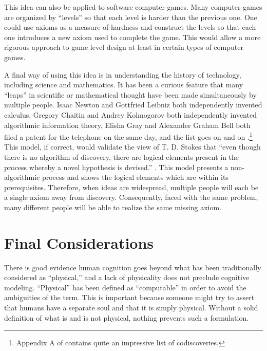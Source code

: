 This idea can also be applied to software computer games.  Many computer games are organized by ``levels'' so that each level is harder than the previous one.  One could use axioms as a measure of hardness and construct the levels so that each one introduces a new axiom used to complete the game.  This would allow a more rigorous approach to game level design at least in certain types of computer games.

A final way of using this idea is in understanding the history of technology, including science and mathematics.  It has been a curious feature that many ``leaps'' in scientific or mathematical thought have been made simultaneously by multiple people.  Isaac Newton and Gottfried Leibniz both independently invented calculus, Gregory Chaitin and Andrey Kolmogorov both independently invented algorithmic information theory, Elisha Gray and Alexander Graham Bell both filed a patent for the telephone on the same day, and the list goes on and on .\footnote{Appendix A of \citet{aboitesetal2012} contains quite an impressive list of codiscoveries.}  This model, if correct, would validate the view of T. D. Stokes that ``even though there is no algorithm of discovery, there are logical elements present in the process whereby a novel hypothesis is devised.'' \citep[][p.~111]{stokes1986}.  This model presents a non-algorithmic process and shows the logical elements which are within its prerequisites.  Therefore, when ideas are widespread, multiple people will each be a single axiom away from discovery.  Consequently, faced with the same problem, many different people will be able to realize the same missing axiom.

\section{Final Considerations}
\label{sec:final_considerations}

There is good evidence human cognition goes beyond what has been traditionally considered as ``physical,'' and a lack of physicality does not preclude cognitive modeling.  ``Physical'' has been defined as ``computable'' in order to avoid the ambiguities of the term.  This is important because someone might try to assert that humans have a separate soul and that it is simply physical.  Without a solid definition of what is and is not physical, nothing prevents such a formulation.   

